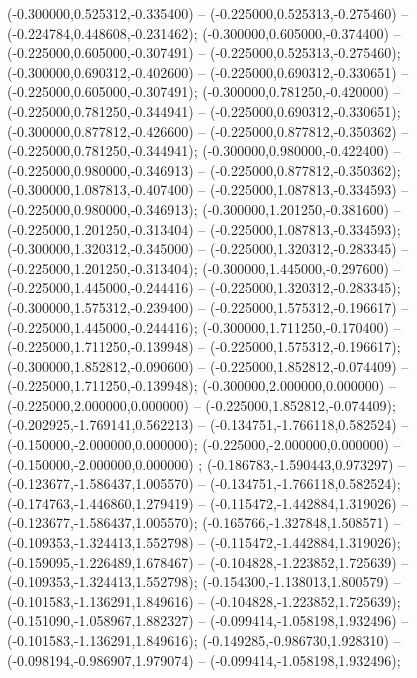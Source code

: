  (-0.300000,0.525312,-0.335400) -- (-0.225000,0.525313,-0.275460) -- (-0.224784,0.448608,-0.231462);
 (-0.300000,0.605000,-0.374400) -- (-0.225000,0.605000,-0.307491) -- (-0.225000,0.525313,-0.275460);
 (-0.300000,0.690312,-0.402600) -- (-0.225000,0.690312,-0.330651) -- (-0.225000,0.605000,-0.307491);
 (-0.300000,0.781250,-0.420000) -- (-0.225000,0.781250,-0.344941) -- (-0.225000,0.690312,-0.330651);
 (-0.300000,0.877812,-0.426600) -- (-0.225000,0.877812,-0.350362) -- (-0.225000,0.781250,-0.344941);
 (-0.300000,0.980000,-0.422400) -- (-0.225000,0.980000,-0.346913) -- (-0.225000,0.877812,-0.350362);
 (-0.300000,1.087813,-0.407400) -- (-0.225000,1.087813,-0.334593) -- (-0.225000,0.980000,-0.346913);
 (-0.300000,1.201250,-0.381600) -- (-0.225000,1.201250,-0.313404) -- (-0.225000,1.087813,-0.334593);
 (-0.300000,1.320312,-0.345000) -- (-0.225000,1.320312,-0.283345) -- (-0.225000,1.201250,-0.313404);
 (-0.300000,1.445000,-0.297600) -- (-0.225000,1.445000,-0.244416) -- (-0.225000,1.320312,-0.283345);
 (-0.300000,1.575312,-0.239400) -- (-0.225000,1.575312,-0.196617) -- (-0.225000,1.445000,-0.244416);
 (-0.300000,1.711250,-0.170400) -- (-0.225000,1.711250,-0.139948) -- (-0.225000,1.575312,-0.196617);
 (-0.300000,1.852812,-0.090600) -- (-0.225000,1.852812,-0.074409) -- (-0.225000,1.711250,-0.139948);
 (-0.300000,2.000000,0.000000) -- (-0.225000,2.000000,0.000000) -- (-0.225000,1.852812,-0.074409);
 (-0.202925,-1.769141,0.562213) -- (-0.134751,-1.766118,0.582524) -- (-0.150000,-2.000000,0.000000);
 (-0.225000,-2.000000,0.000000) -- (-0.150000,-2.000000,0.000000) ;
 (-0.186783,-1.590443,0.973297) -- (-0.123677,-1.586437,1.005570) -- (-0.134751,-1.766118,0.582524);
 (-0.174763,-1.446860,1.279419) -- (-0.115472,-1.442884,1.319026) -- (-0.123677,-1.586437,1.005570);
 (-0.165766,-1.327848,1.508571) -- (-0.109353,-1.324413,1.552798) -- (-0.115472,-1.442884,1.319026);
 (-0.159095,-1.226489,1.678467) -- (-0.104828,-1.223852,1.725639) -- (-0.109353,-1.324413,1.552798);
 (-0.154300,-1.138013,1.800579) -- (-0.101583,-1.136291,1.849616) -- (-0.104828,-1.223852,1.725639);
 (-0.151090,-1.058967,1.882327) -- (-0.099414,-1.058198,1.932496) -- (-0.101583,-1.136291,1.849616);
 (-0.149285,-0.986730,1.928310) -- (-0.098194,-0.986907,1.979074) -- (-0.099414,-1.058198,1.932496);
